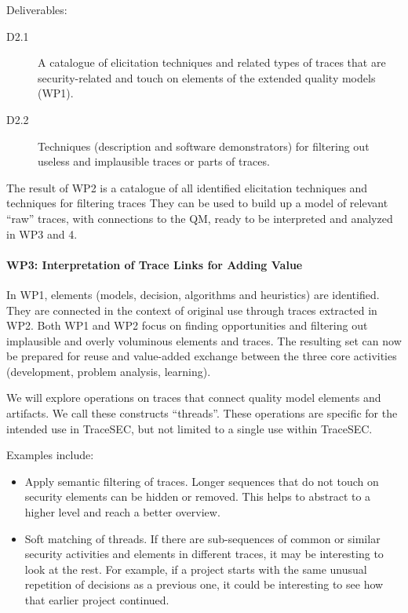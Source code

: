 Deliverables: 
\begin{description}
\item[D2.1] A catalogue of elicitation techniques and related types of traces that are security-related and touch on elements of the extended quality models (WP1). 
\item[D2.2] Techniques (description and software demonstrators) for filtering out useless and implausible traces or parts of traces.
\end{description}

The result of WP2 is a catalogue of all identified elicitation techniques and techniques for filtering traces They can be used to build up a model of relevant “raw” traces, with connections to the QM, ready to be interpreted and analyzed in WP3 and 4.

\paragraph*{WP3: Interpretation of Trace Links for Adding Value}
In WP1, elements (models, decision, algorithms and heuristics) are identified. They are connected in the context of original use through traces extracted in WP2. Both WP1 and WP2 focus on finding opportunities and filtering out implausible and overly voluminous elements and traces. The resulting set can now be prepared for reuse and value-added exchange between the three core activities (development, problem analysis, learning). 

We will explore operations on traces that connect quality model elements and artifacts. We call these constructs “threads”. These operations are specific for the intended use in TraceSEC, but not limited to a single use within TraceSEC.

Examples include:
\begin{itemize}
\item Apply semantic filtering of traces. Longer sequences that do not touch on security elements can be hidden or removed. This helps to abstract to a higher level and reach a better overview. 
\item Soft matching of threads. If there are sub-sequences of common or similar security activities and elements in different traces, it may be interesting to look at the rest. For example, if a project starts with the same unusual repetition of decisions as a previous one, it could be interesting to see how that earlier project continued.
\end{itemize}

